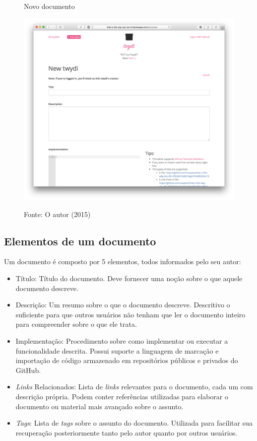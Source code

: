 \begin{figure}[h]
	\centering
    \caption{Novo documento}
    \includegraphics[width=15cm]{Imagens/print-new-twydi.png}
		\label{fig:doc-new}
	\caption*{Fonte: O autor (2015)}
\end{figure}

\subsection{Elementos de um documento}

Um documento é composto por 5 elementos, todos informados pelo seu autor:

\begin{itemize}
  \item Título: Título do documento. Deve fornecer uma noção sobre o que aquele documento descreve.
  \item Descrição: Um resumo sobre o que o documento descreve. Descritivo o suficiente para que outros usuários não tenham que ler o documento inteiro para compreender sobre o que ele trata.
  \item Implementação: Procedimento sobre como implementar ou executar a funcionalidade descrita. Possui suporte a linguagem de marcação e importação de código armazenado em repositórios públicos e privados do GitHub.
   \item \textit{Links} Relacionados: Lista de \textit{links} relevantes para o documento, cada um com descrição própria. Podem conter referências utilizadas para elaborar o documento ou material mais avançado sobre o assunto.
  \item \textit{Tags}: Lista de \textit{tags} sobre o assunto do documento. Utilizada para facilitar sua recuperação posteriormente tanto pelo autor quanto por outros usuários.
\end{itemize}

